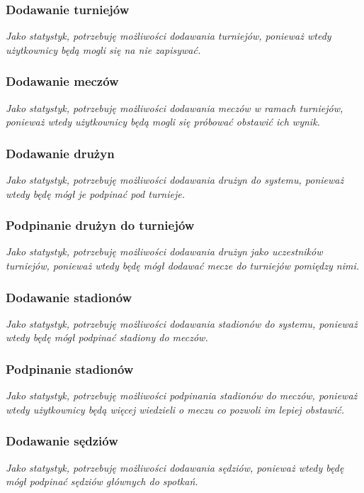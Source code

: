 \documentclass{mwrep}[15pt]
\begin{document}
\subsubsection{Dodawanie turniejów}
\emph{Jako statystyk, potrzebuję możliwości dodawania turniejów, ponieważ wtedy użytkownicy będą mogli się na nie zapisywać.}

\subsubsection{Dodawanie meczów}
\emph{Jako statystyk, potrzebuję możliwości dodawania meczów w ramach turniejów, ponieważ wtedy użytkownicy będą mogli się próbować obstawić ich wynik.}

\subsubsection{Dodawanie drużyn}
\emph{Jako statystyk, potrzebuję możliwości dodawania drużyn do systemu, ponieważ wtedy będę mógł je podpinać pod turnieje.}

\subsubsection{Podpinanie drużyn do turniejów}
\emph{Jako statystyk, potrzebuję możliwości dodawania drużyn jako uczestników turniejów, ponieważ wtedy będę mógł dodawać mecze do turniejów pomiędzy nimi.}

\subsubsection{Dodawanie stadionów}
\emph{Jako statystyk, potrzebuję możliwości dodawania stadionów do systemu, ponieważ wtedy będę mógł podpinać stadiony do meczów.}

\subsubsection{Podpinanie stadionów}
\emph{Jako statystyk, potrzebuję możliwości podpinania stadionów do meczów, ponieważ wtedy użytkownicy będą więcej wiedzieli o meczu co pozwoli im lepiej obstawić.}

\subsubsection{Dodawanie sędziów}
\emph{Jako statystyk, potrzebuję możliwości dodawania sędziów, ponieważ wtedy będę mógł podpinać sędziów głównych do spotkań.}
\end{document}
